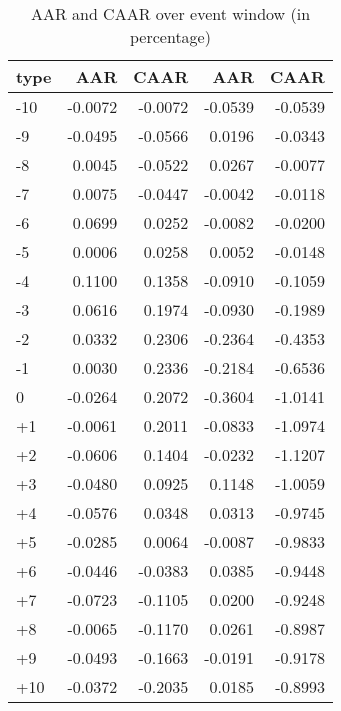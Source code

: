 \begin{table}[ht]
\centering
\begin{tabular}{lrrrr}
  \hline
type & AAR & CAAR & AAR & CAAR \\ 
  \hline
-10 & -0.0072 & -0.0072 & -0.0539 & -0.0539 \\ 
  -9 & -0.0495 & -0.0566 & 0.0196 & -0.0343 \\ 
  -8 & 0.0045 & -0.0522 & 0.0267 & -0.0077 \\ 
  -7 & 0.0075 & -0.0447 & -0.0042 & -0.0118 \\ 
  -6 & 0.0699 & 0.0252 & -0.0082 & -0.0200 \\ 
  -5 & 0.0006 & 0.0258 & 0.0052 & -0.0148 \\ 
  -4 & 0.1100 & 0.1358 & -0.0910 & -0.1059 \\ 
  -3 & 0.0616 & 0.1974 & -0.0930 & -0.1989 \\ 
  -2 & 0.0332 & 0.2306 & -0.2364 & -0.4353 \\ 
  -1 & 0.0030 & 0.2336 & -0.2184 & -0.6536 \\ 
  0 & -0.0264 & 0.2072 & -0.3604 & -1.0141 \\ 
  +1 & -0.0061 & 0.2011 & -0.0833 & -1.0974 \\ 
  +2 & -0.0606 & 0.1404 & -0.0232 & -1.1207 \\ 
  +3 & -0.0480 & 0.0925 & 0.1148 & -1.0059 \\ 
  +4 & -0.0576 & 0.0348 & 0.0313 & -0.9745 \\ 
  +5 & -0.0285 & 0.0064 & -0.0087 & -0.9833 \\ 
  +6 & -0.0446 & -0.0383 & 0.0385 & -0.9448 \\ 
  +7 & -0.0723 & -0.1105 & 0.0200 & -0.9248 \\ 
  +8 & -0.0065 & -0.1170 & 0.0261 & -0.8987 \\ 
  +9 & -0.0493 & -0.1663 & -0.0191 & -0.9178 \\ 
  +10 & -0.0372 & -0.2035 & 0.0185 & -0.8993 \\ 
   \hline
\end{tabular}
\caption{AAR and CAAR over event window (in percentage)} 
\end{table}

